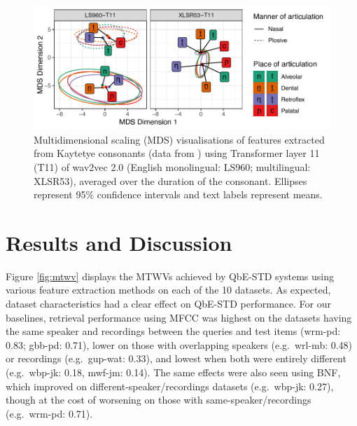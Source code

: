 \documentclass{article}
\begin{document}
\begin{figure}[!ht]
  \centering
  \includegraphics[width=0.75\linewidth]{T11-ellipses.pdf}
  \caption{Multidimensional scaling (MDS) visualisations of features extracted from Kaytetye consonants (data from \cite{harvey2015contrastive}) using Transformer layer 11 (T11) of wav2vec 2.0 (English monolingual: LS960; multilingual: XLSR53), averaged over the duration of the consonant. Ellipses represent 95\% confidence intervals and text labels represent means.}
  \label{fig:ellipses}
\end{figure}

\section{Results and Discussion}
\label{sec:results}

Figure \ref{fig:mtwv} displays the MTWVs achieved by QbE-STD systems using various feature extraction methods on each of the 10 datasets.
As expected, dataset characteristics had a clear effect on QbE-STD performance.
For our baselines, retrieval performance using MFCC was highest on the datasets having the same speaker and recordings between the queries and test items (wrm-pd: 0.83; gbb-pd: 0.71), lower on those with overlapping speakers (e.g.~wrl-mb: 0.48) or recordings (e.g.~gup-wat: 0.33), and lowest when both were entirely different (e.g.~wbp-jk: 0.18, mwf-jm: 0.14).
The same effects were also seen using BNF, which improved on different-speaker/recordings datasets (e.g.~wbp-jk: 0.27), though at the cost of worsening on those with same-speaker/recordings (e.g.~wrm-pd: 0.71).
\end{document}
